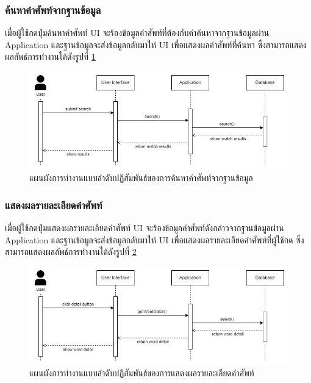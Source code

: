 \documentclass[12pt,oneside,openright,a4paper]{cpe-thai-project}
\begin{document}
\pagebreak
\subsubsection{ค้นหาคำศัพท์จากฐานข้อมูล}
\hspace{1cm}
เมื่อผู้ใช้กดปุ่มค้นหาคำศัพท์ UI จะร้องข้อมูลคำศัพท์ที่ต้องกับคำค้นหาจากฐานข้อมูลผ่าน Application
และฐานข้อมูลจะส่งข้อมูลกลับมาให้ UI เพื่อแสดงผลคำศัพท์ที่ค้นหา ซึ่งสามารถแสดงผลลัพธ์การทำงานได้ดังรูปที่ \ref{fig:S_SearchWord}
\begin{figure}[!h]\centering
	\includegraphics[width=\textwidth, keepaspectratio=true]{image/chap3/sequence/Search.jpg}
	\caption{แผนผังการทำงานแบบลำดับปฏิสัมพันธ์ของการค้นหาคำศัพท์จากฐานข้อมูล}\label{fig:S_SearchWord}
\end{figure}


\subsubsection{แสดงผลรายละเอียดคำศัพท์}
\hspace{1cm}
เมื่อผู้ใช้กดปุ่มแสดงผลรายละเอียดคำศัพท์ UI จะร้องข้อมูลคำศัพท์ดังกล่าวจากฐานข้อมูลผ่าน Application
และฐานข้อมูลจะส่งข้อมูลกลับมาให้ UI เพื่อแสดงผลรายละเอียดคำศัพท์ที่ผู้ใช้กด ซึ่งสามารถแสดงผลลัพธ์การทำงานได้ดังรูปที่ \ref{fig:S_WordDetail}
\begin{figure}[!h]\centering
	\includegraphics[width=\textwidth, keepaspectratio=true]{image/chap3/sequence/View-Search.jpg}
	\caption{แผนผังการทำงานแบบลำดับปฏิสัมพันธ์ของการแสดงผลรายละเอียดคำศัพท์}\label{fig:S_WordDetail}
\end{figure}
\end{document}
